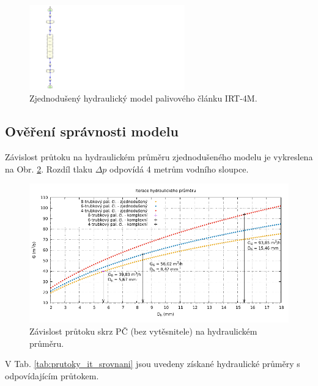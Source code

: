 \begin{figure}
	\centering
	\includegraphics[width=0.6\textwidth, trim={0cm 0cm 39cm 0cm},clip]{./04_TH_model_IRT/obrazky/hydraulic_irt_simple_relap.pdf}
	\caption{Zjednodušený hydraulický model palivového článku IRT-4M.}
	\label{fig:irt_hydraulic_simple_relap}
\end{figure}
\subsection{Ověření správnosti modelu}
Závislost průtoku na hydraulickém průměru zjednodušeného modelu je vykreslena na Obr. \ref{fig:iterated_dh}. Rozdíl tlaku $\Delta p$ odpovídá 4 metrům vodního sloupce.
\begin{figure}[H]
	\centering
	\includegraphics[width=\textwidth]{./04_TH_model_IRT/grafy/extrapolace_dh.pdf}
	\caption{Závislost průtoku skrz PČ (bez vytěsnitele) na hydraulickém průměru.}
	\label{fig:iterated_dh}
\end{figure}
V Tab. \ref{tab:prutoky_it_srovnani} jsou uvedeny získané hydraulické průměry s odpovídajícím průtokem.
